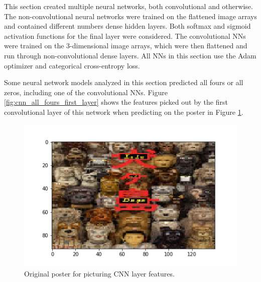 \documentclass[12pt, oneside]{article}   	%
\begin{document}
This section created multiple neural networks, both convolutional and otherwise. The non-convolutional neural networks were trained on the flattened image arrays and contained different numbers dense hidden layers. Both softmax and sigmoid activation functions for the final layer were considered. The convolutional NNs were trained on the 3-dimensional image arrays, which were then flattened and run through non-convolutional dense layers. All NNs in this section use the Adam optimizer and categorical cross-entropy loss.

Some neural network models analyzed in this section predicted all fours or all zeros, including one of the convolutional NNs. Figure \ref{fig:cnn_all_fours_first_layer} shows the features picked out by the first convolutional layer of this network when predicting on the poster in Figure \ref{fig:isle_of_dogs_poster}.

\begin{figure}%
\includegraphics[width=\textwidth]{isle_of_dogs_poster}
\caption{\label{fig:isle_of_dogs_poster}Original poster for picturing CNN layer features.}
\end{figure}
\end{document}

